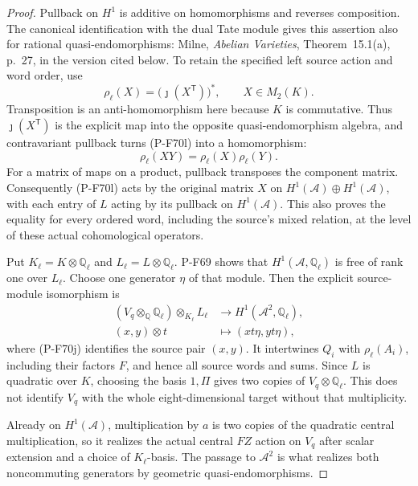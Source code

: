 \begin{proof}
Pullback on $H^1$ is additive on homomorphisms and reverses
composition.  The canonical identification with the dual
Tate module gives this assertion also for rational
quasi-endomorphisms: Milne, \emph{Abelian Varieties},
Theorem~15.1(a), p.~27, in the version cited below.
To retain the
specified left source action and word order, use
\[
          \rho_\ell(X)=\bigl(\jmath(X^{\mathsf T})\bigr)^*,
                           \qquad X\in M_2(K).                \tag{P-F70l}
\]
Transposition is an anti-homomorphism here because $K$
is commutative.  Thus $\jmath(X^{\mathsf T})$ is the
explicit map into the opposite quasi-endomorphism
algebra, and contravariant pullback turns (P-F70l)
into a homomorphism:
\[
                         \rho_\ell(XY)=\rho_\ell(X)\rho_\ell(Y).
\]
For a matrix of maps on a product, pullback transposes
the component matrix.  Consequently (P-F70l) acts by
the original matrix $X$ on
$H^1(\mathcal A)\oplus H^1(\mathcal A)$, with each
entry of $L$ acting by its pullback on $H^1(\mathcal A)$.
This also proves the equality for every ordered word,
including the source's mixed relation, at the level of
these actual cohomological operators.

Put $K_\ell=K\otimes\mathbb Q_\ell$ and
$L_\ell=L\otimes\mathbb Q_\ell$.  P-F69 shows that
$H^1(\mathcal A,\mathbb Q_\ell)$ is free of rank one over
$L_\ell$.  Choose one generator $\eta$ of that module.
Then the explicit source-module isomorphism is
\[
 \begin{split}
 (V_q\otimes_{\mathbb Q}\mathbb Q_\ell)
                   \otimes_{K_\ell}L_\ell
       &\longrightarrow H^1(\mathcal A^2,\mathbb Q_\ell),\\
 (x,y)\otimes t&\longmapsto(xt\eta,yt\eta),
 \end{split}                                                   \tag{P-F70m}
\]
where (P-F70j) identifies the source pair $(x,y)$.
It intertwines $Q_i$ with $\rho_\ell(A_i)$, including
their factors $F$, and hence all source words and sums.
Since $L$ is quadratic over $K$, choosing the basis
$1,\Pi$ gives two copies of $V_q\otimes\mathbb Q_\ell$.
This does not identify $V_q$ with the whole
eight-dimensional target without that multiplicity.

Already on $H^1(\mathcal A)$, multiplication by $a$ is
two copies of the quadratic central multiplication,
so it realizes the actual central $FZ$ action on
$V_q$ after scalar extension and a choice of $K_\ell$-basis.
The passage to $\mathcal A^2$ is what realizes both
noncommuting generators by geometric quasi-endomorphisms.


\end{proof}
